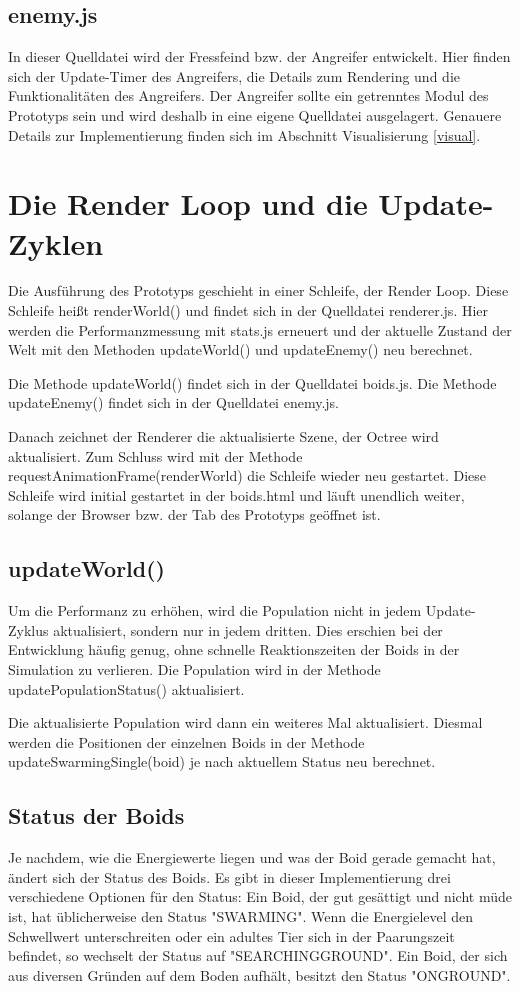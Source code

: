 \documentclass[draft=false
              ,paper=a4
              ,twoside=false
              ,fontsize=11pt
              ,headsepline
              ,BCOR10mm
              ,DIV11
              ,bibtotoc
              ,liststotoc
              ]{scrbook}
\begin{document}
\subsection{enemy.js}
In dieser Quelldatei wird der Fressfeind bzw. der Angreifer entwickelt. Hier finden sich der Update-Timer des Angreifers, die Details zum Rendering und die Funktionalitäten des Angreifers. Der Angreifer sollte ein getrenntes Modul des Prototyps sein und wird deshalb in eine eigene Quelldatei ausgelagert. Genauere Details zur Implementierung finden sich im Abschnitt Visualisierung \ref{visual}.

\section{Die Render Loop und die Update-Zyklen}
Die Ausführung des Prototyps geschieht in einer Schleife, der Render Loop. Diese Schleife heißt renderWorld() und findet sich in der Quelldatei renderer.js. Hier werden die Performanzmessung mit stats.js erneuert und der aktuelle Zustand der Welt mit den Methoden updateWorld() und updateEnemy() neu berechnet.

Die Methode updateWorld() findet sich in der Quelldatei boids.js. Die Methode updateEnemy() findet sich in der Quelldatei enemy.js.

Danach zeichnet der Renderer die aktualisierte Szene, der Octree wird aktualisiert. Zum Schluss wird mit der Methode requestAnimationFrame(renderWorld) die Schleife wieder neu gestartet. Diese Schleife wird initial gestartet in der boids.html und läuft unendlich weiter, solange der Browser bzw. der Tab des Prototyps geöffnet ist.

\subsection{updateWorld()}
Um die Performanz zu erhöhen, wird die Population nicht in jedem Update-Zyklus aktualisiert, sondern nur in jedem dritten. Dies erschien bei der Entwicklung häufig genug, ohne schnelle Reaktionszeiten der Boids in der Simulation zu verlieren. Die Population wird in der Methode updatePopulationStatus() aktualisiert.

Die aktualisierte Population wird dann ein weiteres Mal aktualisiert. Diesmal werden die Positionen der einzelnen Boids in der Methode updateSwarmingSingle(boid) je nach aktuellem Status neu berechnet.

\subsection{Status der Boids}
Je nachdem, wie die Energiewerte liegen und was der Boid gerade gemacht hat, ändert sich der Status des Boids. Es gibt in dieser Implementierung drei verschiedene Optionen für den Status:
Ein Boid, der gut gesättigt und nicht müde ist, hat üblicherweise den Status "{}SWARMING"{}. Wenn die Energielevel den Schwellwert unterschreiten oder ein adultes Tier sich in der Paarungszeit befindet, so wechselt der Status auf "{}SEARCHINGGROUND"{}. Ein Boid, der sich aus diversen Gründen auf dem Boden aufhält, besitzt den Status "{}ONGROUND"{}.
\end{document}
